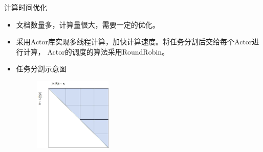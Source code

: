\begin{frame}[label=sec-2-13]{计算时间优化}
\begin{itemize}
\item 文档数量多，计算量很大，需要一定的优化。
\item 采用Actor库实现多线程计算，加快计算速度。将任务分割后交给每个Actor进行计算，
Actor的调度的算法采用RoundRobin。
\item 任务分割示意图
\begin{figure}[hb]
  \centering
  \includegraphics[width=0.35\textwidth]{triangle.jpg}
\end{figure}
\end{itemize}
\end{frame}
